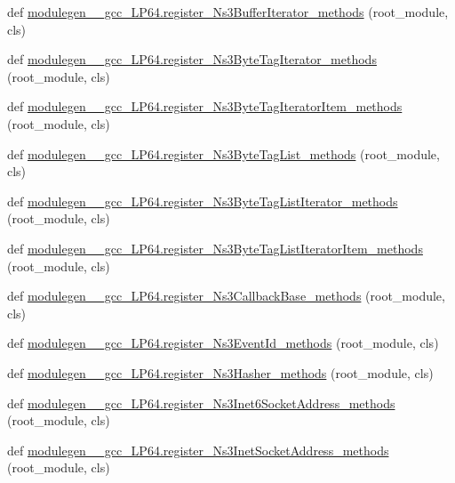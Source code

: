 \begin{DoxyCompactItemize}
\item 
def \hyperlink{namespacemodulegen____gcc__LP64_a219f36a56f22b6e50de65d276cdf742d}{modulegen\+\_\+\+\_\+gcc\+\_\+\+L\+P64.\+register\+\_\+\+Ns3\+Buffer\+Iterator\+\_\+methods} (root\+\_\+module, cls)
\item 
def \hyperlink{namespacemodulegen____gcc__LP64_ae692c5fa47566ed6b225ae5a5ca35235}{modulegen\+\_\+\+\_\+gcc\+\_\+\+L\+P64.\+register\+\_\+\+Ns3\+Byte\+Tag\+Iterator\+\_\+methods} (root\+\_\+module, cls)
\item 
def \hyperlink{namespacemodulegen____gcc__LP64_ade2c2970e32bf8b776b3624afcc4082d}{modulegen\+\_\+\+\_\+gcc\+\_\+\+L\+P64.\+register\+\_\+\+Ns3\+Byte\+Tag\+Iterator\+Item\+\_\+methods} (root\+\_\+module, cls)
\item 
def \hyperlink{namespacemodulegen____gcc__LP64_ad929f8749eef52cadc734fee358cacd9}{modulegen\+\_\+\+\_\+gcc\+\_\+\+L\+P64.\+register\+\_\+\+Ns3\+Byte\+Tag\+List\+\_\+methods} (root\+\_\+module, cls)
\item 
def \hyperlink{namespacemodulegen____gcc__LP64_aa7b7804ddcf3a3b4d83820f193414ea4}{modulegen\+\_\+\+\_\+gcc\+\_\+\+L\+P64.\+register\+\_\+\+Ns3\+Byte\+Tag\+List\+Iterator\+\_\+methods} (root\+\_\+module, cls)
\item 
def \hyperlink{namespacemodulegen____gcc__LP64_a262c89a667105a6a7bc764058f464ab3}{modulegen\+\_\+\+\_\+gcc\+\_\+\+L\+P64.\+register\+\_\+\+Ns3\+Byte\+Tag\+List\+Iterator\+Item\+\_\+methods} (root\+\_\+module, cls)
\item 
def \hyperlink{namespacemodulegen____gcc__LP64_a911c07db6d52106940012fbb077a0853}{modulegen\+\_\+\+\_\+gcc\+\_\+\+L\+P64.\+register\+\_\+\+Ns3\+Callback\+Base\+\_\+methods} (root\+\_\+module, cls)
\item 
def \hyperlink{namespacemodulegen____gcc__LP64_a11034b778f9a07d9c47a0824be6df6c6}{modulegen\+\_\+\+\_\+gcc\+\_\+\+L\+P64.\+register\+\_\+\+Ns3\+Event\+Id\+\_\+methods} (root\+\_\+module, cls)
\item 
def \hyperlink{namespacemodulegen____gcc__LP64_a6615c86326777b99b9d48f2543fa24fb}{modulegen\+\_\+\+\_\+gcc\+\_\+\+L\+P64.\+register\+\_\+\+Ns3\+Hasher\+\_\+methods} (root\+\_\+module, cls)
\item 
def \hyperlink{namespacemodulegen____gcc__LP64_a33ba058421864db1972ed4a87cb086fe}{modulegen\+\_\+\+\_\+gcc\+\_\+\+L\+P64.\+register\+\_\+\+Ns3\+Inet6\+Socket\+Address\+\_\+methods} (root\+\_\+module, cls)
\item 
def \hyperlink{namespacemodulegen____gcc__LP64_ac7474a92931aa2d401ee9815d47b594e}{modulegen\+\_\+\+\_\+gcc\+\_\+\+L\+P64.\+register\+\_\+\+Ns3\+Inet\+Socket\+Address\+\_\+methods} (root\+\_\+module, cls)

\end{DoxyCompactItemize}
